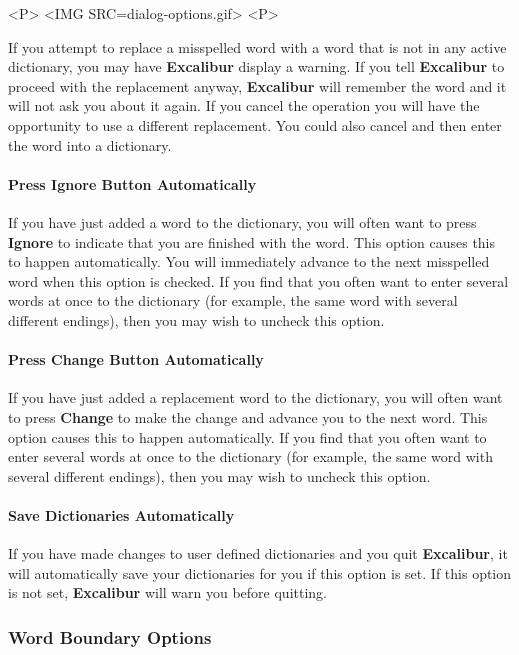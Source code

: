﻿\documentclass[11pt,titlepage]{article}
\newcommand{\ex}{\textbf{Excalibur}}
\begin{document}
\begin{rawhtml}
<P>
<IMG SRC=dialog-options.gif>
<P>
\end{rawhtml}

If you attempt to replace a misspelled word with a word that is not in
any active dictionary, you may have \ex{} display a warning.  If you
tell \ex{} to proceed with the replacement anyway, \ex{} will remember
the word and it will not ask you about it again.  If you cancel the
operation you will have the opportunity to use a different
replacement.  You could also cancel and then enter the word into a
dictionary.

\paragraph{Press Ignore Button Automatically}

If you have just added a word to the dictionary, you will often want
to press \textbf{Ignore} to indicate that you are finished with the
word.  This option causes this to happen automatically. You will
immediately advance to the next misspelled word when this option is
checked. If you find that you often want to enter several words at
once to the dictionary (for example, the same word with several
different endings), then you may wish to uncheck this option.

\paragraph{Press Change Button Automatically}

If you have just added a replacement word to the dictionary, you will
often want to press \textbf{Change} to make the change and advance you
to the next word. This option causes this to happen automatically. If
you find that you often want to enter several words at once to the
dictionary (for example, the same word with several different
endings), then you may wish to uncheck this option.

\paragraph{Save Dictionaries Automatically}

If you have made changes to user defined dictionaries and you quit
\ex, it will automatically save your dictionaries for you if this
option is set. If this option is not set, \ex{} will warn you before
quitting.

\subsubsection{Word Boundary Options}
\end{document}
